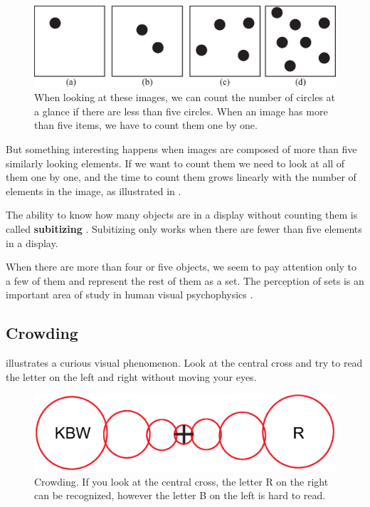 \begin{figure}
\centerline{
\includegraphics[width=1\linewidth]{figures/heeger_bergen/parallel_counting.eps}
}
\caption{When looking at these images, we can count the number of circles at a glance if there are less than five circles. When an image has more than five items, we have to count them one by one. 
}
\label{fig:parallel_counting}
\end{figure}

But something interesting happens when images are composed of more than five similarly looking elements. If we want to count them we need to look at all of them one by one, and the time to count them grows linearly with the number of elements in the image, as illustrated in \fig{\ref{fig:parallel_counting}}. 

The ability to know how many objects are in a display without counting them is called {\bf subitizing} \cite{Kaufman1949}. Subitizing only works when there are fewer than five elements in a display. 

When there are more than four or five objects, we seem to pay attention only to a few of them and represent the rest of them as a set. The perception of sets is an important area of study in human visual psychophysics \cite{Ariely2001}.





\subsection{Crowding}

\Fig{\ref{fig:crowding}} illustrates a curious visual phenomenon.
Look at the central cross and try to read the letter on the left and right without moving your eyes. 

\begin{figure}
\centerline{
\includegraphics[width=1\linewidth]{figures/heeger_bergen/crowding.eps}
}
\caption{Crowding. If you look at the central cross, the letter R on the right can be recognized, however the letter B on the left is hard to read.  
}
\label{fig:crowding}
\end{figure}

